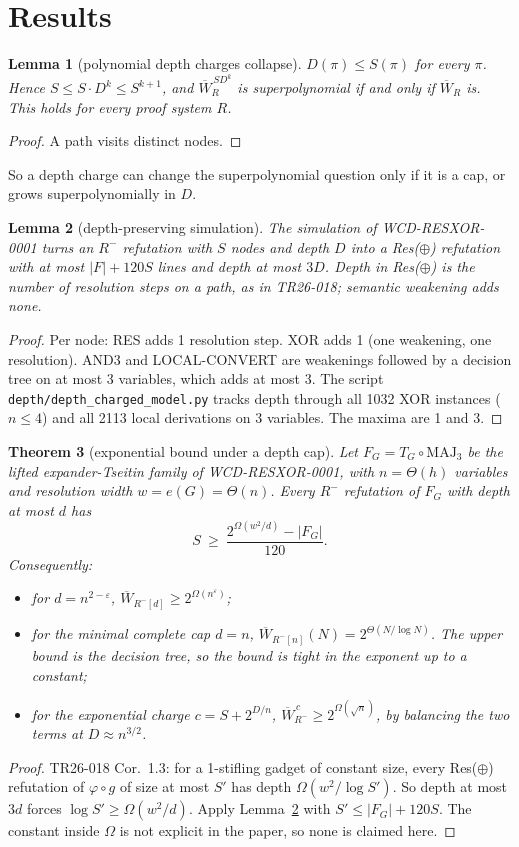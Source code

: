 \documentclass[11pt]{article}
\newtheorem{theorem}{Theorem}
\newtheorem{lemma}[theorem]{Lemma}
\begin{document}
\section{Results}
\begin{lemma}[polynomial depth charges collapse]\label{lem:collapse}
$D(\pi)\le S(\pi)$ for every $\pi$. Hence $S\le S\cdot D^k\le S^{k+1}$, and $\overline W^{\,S D^k}_{R}$ is superpolynomial if and only if $\overline W_R$ is. This holds for every proof system $R$.
\end{lemma}
\begin{proof}
A path visits distinct nodes.
\end{proof}
So a depth charge can change the superpolynomial question only if it is a cap, or grows superpolynomially in $D$.

\begin{lemma}[depth-preserving simulation]\label{lem:depth}
The simulation of WCD-RESXOR-0001 turns an $R^-$ refutation with $S$ nodes and depth $D$ into a Res($\oplus$) refutation with at most $|F|+120S$ lines and depth at most $3D$. Depth in Res($\oplus$) is the number of resolution steps on a path, as in TR26-018; semantic weakening adds none.
\end{lemma}
\begin{proof}
Per node: RES adds 1 resolution step. XOR adds 1 (one weakening, one resolution). AND3 and LOCAL-CONVERT are weakenings followed by a decision tree on at most 3 variables, which adds at most 3. The script \texttt{depth/depth\_charged\_model.py} tracks depth through all 1032 XOR instances ($n\le4$) and all 2113 local derivations on 3 variables. The maxima are 1 and 3.
\end{proof}

\begin{theorem}[exponential bound under a depth cap]\label{thm:cap}
Let $F_G=T_G\circ\mathrm{MAJ}_3$ be the lifted expander-Tseitin family of WCD-RESXOR-0001, with $n=\Theta(h)$ variables and resolution width $w=e(G)=\Theta(n)$. Every $R^-$ refutation of $F_G$ with depth at most $d$ has
\[S\ \ge\ \frac{2^{\Omega(w^2/d)}-|F_G|}{120}.\]
Consequently:
\begin{itemize}
\item for $d=n^{2-\varepsilon}$, $\overline W_{R^-[d]}\ge 2^{\Omega(n^{\varepsilon})}$;
\item for the minimal complete cap $d=n$, $\overline W_{R^-[n]}(N)=2^{\Theta(N/\log N)}$. The upper bound is the decision tree, so the bound is tight in the exponent up to a constant;
\item for the exponential charge $c=S+2^{D/n}$, $\overline W^{\,c}_{R^-}\ge 2^{\Omega(\sqrt n)}$, by balancing the two terms at $D\approx n^{3/2}$.
\end{itemize}
\end{theorem}
\begin{proof}
TR26-018 Cor.~1.3: for a 1-stifling gadget of constant size, every Res($\oplus$) refutation of $\varphi\circ g$ of size at most $S'$ has depth $\Omega(w^2/\log S')$. So depth at most $3d$ forces $\log S'\ge\Omega(w^2/d)$. Apply Lemma~\ref{lem:depth} with $S'\le|F_G|+120S$. The constant inside $\Omega$ is not explicit in the paper, so none is claimed here.
\end{proof}
\end{document}
